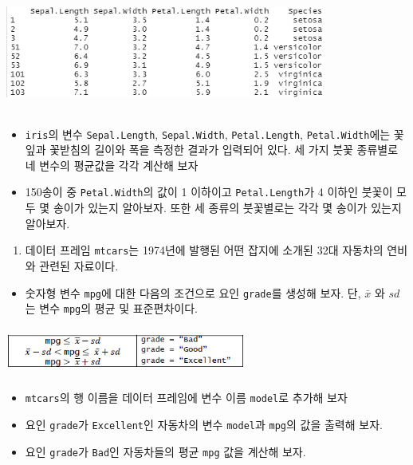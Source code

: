 \documentclass[
]{book}
\providecommand{\tightlist}{%
  \setlength{\itemsep}{0pt}\setlength{\parskip}{0pt}}
\begin{document}
\begin{center}\includegraphics[width=400px,height=150]{Figure/ch2_ex_21_1} \end{center}

\begin{itemize}
\item
  \texttt{iris}의 변수 \texttt{Sepal.Length}, \texttt{Sepal.Width}, \texttt{Petal.Length}, \texttt{Petal.Width}에는 꽃잎과 꽃받침의 길이와 폭을 측정한 결과가 입력되어 있다. 세 가지 붓꽃 종류별로 네 변수의 평균값을 각각 계산해 보자
\item
  150송이 중 \texttt{Petal.Width}의 값이 1 이하이고 \texttt{Petal.Length}가 4 이하인 붓꽃이 모두 몇 송이가 있는지 알아보자. 또한 세 종류의 붓꽃별로는 각각 몇 송이가 있는지 알아보자.
\end{itemize}

\begin{enumerate}
\def\labelenumi{\arabic{enumi}.}
\setcounter{enumi}{1}
\tightlist
\item
  데이터 프레임 \texttt{mtcars}는 1974년에 발행된 어떤 잡지에 소개된 32대 자동차의 연비와 관련된 자료이다.
\end{enumerate}

\begin{itemize}
\tightlist
\item
  숫자형 변수 \texttt{mpg}에 대한 다음의 조건으로 요인 \texttt{grade}를 생성해 보자. 단, \(\bar{x}\) 와 \(sd\) 는 변수 \texttt{mpg}의 평균 및 표준편차이다.
\end{itemize}

\begin{center}\includegraphics[width=300px,height=60]{Figure/ch2_ex_21_2} \end{center}

\begin{itemize}
\item
  \texttt{mtcars}의 행 이름을 데이터 프레임에 변수 이름 \texttt{model}로 추가해 보자
\item
  요인 \texttt{grade}가 \texttt{Excellent}인 자동차의 변수 \texttt{model}과 \texttt{mpg}의 값을 출력해 보자.
\item
  요인 \texttt{grade}가 \texttt{Bad}인 자동차들의 평균 \texttt{mpg} 값을 계산해 보자.
\end{itemize}
\end{document}

